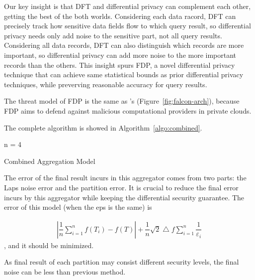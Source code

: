 Our key insight is that DFT and differential privacy can complement each other, 
getting the best of the both worlds. Considering each data racord, DFT can 
precisely track how sensitive data fields flow to which query result, so 
differential privacy needs only add noise to the sensitive part, not all query 
results. Considering all data records, DFT can also distinguish which records 
are more important, so differential privacy can add more noise to the more 
important records than the others. This insight spurs FDP, a novel differential 
privacy technique that can achieve same statistical bounds as prior 
differential privacy techniques, while preverving reasonable accuracy for query 
results.


The threat model of FDP is the same as \kakute's 
(Figure~\ref{fig:falcon-arch}), because FDP aims to defend against malicious 
computational providers in private clouds. 


The complete algorithm is showed in Algorithm~\ref{algo:combined}.

\begin{algorithm}[t]
\SetAlgoLined
{}
  n = 4

 \caption{Combined Aggregation Model}
 \label{algo:combined}
\end{algorithm}

The error of the final result incurs in this aggregator comes from two parts:
the Laps noise error and the partition error. It is crucial to reduce the final
error incurs by this aggregator while keeping the differential security 
guarantee.
The error of this model (when the eps is the same) is

\begin{align}
|\dfrac{1}{n}\sum\limits_{i=1}^n f(T_i) - f(T)| + 
\dfrac{1}{n}\sqrt{2}\bigtriangleup{f}\sum\limits_{i=1}^n\dfrac{1}{\varepsilon_i}
\end{align}, and it should be minimized.

As final result of each partition may consist
different security levels, the final noise can be less than previous method.

